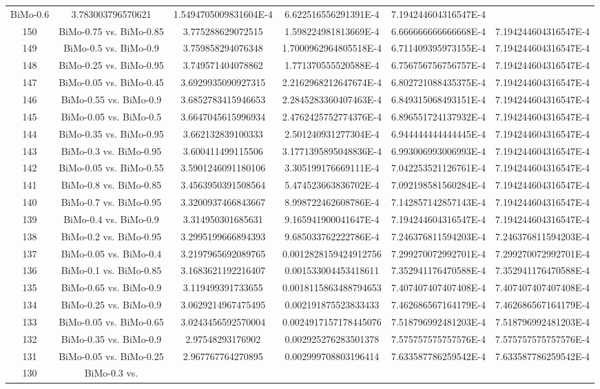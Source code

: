 \documentclass[a4paper,10pt]{article}
\begin{document}
\begin{landscape}
\begin{table}[!htp]
\begin{tabular}{cccccc}
BiMo-0.6&3.783003796570621&1.5494705009831604E-4&6.622516556291391E-4&7.194244604316547E-4\\150&BiMo-0.75 vs. BiMo-0.85&3.775288629072515&1.598224981813669E-4&6.666666666666668E-4&7.194244604316547E-4\\149&BiMo-0.5 vs. BiMo-0.9&3.759858294076348&1.7000962964805518E-4&6.711409395973155E-4&7.194244604316547E-4\\148&BiMo-0.25 vs. BiMo-0.95&3.749571404078862&1.771370555520588E-4&6.756756756756757E-4&7.194244604316547E-4\\147&BiMo-0.05 vs. BiMo-0.45&3.6929935090927315&2.2162968212647674E-4&6.802721088435375E-4&7.194244604316547E-4\\146&BiMo-0.55 vs. BiMo-0.9&3.6852783415946653&2.2845283360407463E-4&6.849315068493151E-4&7.194244604316547E-4\\145&BiMo-0.05 vs. BiMo-0.5&3.6647045615996934&2.4762425752774376E-4&6.896551724137932E-4&7.194244604316547E-4\\144&BiMo-0.35 vs. BiMo-0.95&3.662132839100333&2.501240931277304E-4&6.944444444444445E-4&7.194244604316547E-4\\143&BiMo-0.3 vs. BiMo-0.95&3.600411499115506&3.1771395895048836E-4&6.993006993006993E-4&7.194244604316547E-4\\142&BiMo-0.05 vs. BiMo-0.55&3.5901246091180106&3.305199176669111E-4&7.042253521126761E-4&7.194244604316547E-4\\141&BiMo-0.8 vs. BiMo-0.85&3.4563950391508564&5.474523663836702E-4&7.092198581560284E-4&7.194244604316547E-4\\140&BiMo-0.7 vs. BiMo-0.95&3.3200937466843667&8.998722462608786E-4&7.142857142857143E-4&7.194244604316547E-4\\139&BiMo-0.4 vs. BiMo-0.9&3.314950301685631&9.165941900041647E-4&7.194244604316547E-4&7.194244604316547E-4\\138&BiMo-0.2 vs. BiMo-0.95&3.2995199666894393&9.685033762222786E-4&7.246376811594203E-4&7.246376811594203E-4\\137&BiMo-0.05 vs. BiMo-0.4&3.2197965692089765&0.0012828159424912756&7.299270072992701E-4&7.299270072992701E-4\\136&BiMo-0.1 vs. BiMo-0.85&3.1683621192216407&0.001533004453418611&7.352941176470588E-4&7.352941176470588E-4\\135&BiMo-0.65 vs. BiMo-0.9&3.119499391733655&0.0018115863488794653&7.407407407407408E-4&7.407407407407408E-4\\134&BiMo-0.25 vs. BiMo-0.9&3.0629214967475495&0.002191875523833433&7.462686567164179E-4&7.462686567164179E-4\\133&BiMo-0.05 vs. BiMo-0.65&3.0243456592570004&0.0024917157178445076&7.518796992481203E-4&7.518796992481203E-4\\132&BiMo-0.35 vs. BiMo-0.9&2.97548293176902&0.002925276283501378&7.575757575757576E-4&7.575757575757576E-4\\131&BiMo-0.05 vs. BiMo-0.25&2.967767764270895&0.002999708803196414&7.633587786259542E-4&7.633587786259542E-4\\130&BiMo-0.3 vs. 
\end{tabular}
\end{table}
\end{landscape}
\end{document}
